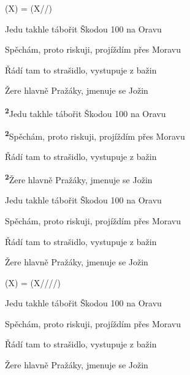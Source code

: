 \begin{song}


\bigskip

(X) = (X//)
\medskip
{}
\medskip

Jedu takhle tábořit Škodou 100 na Oravu \par
{}Spěchám, proto riskuji, projíždím přes Moravu \par
{}Řádí tam to strašidlo, vystupuje z bažin \par
{}Žere hlavně Pražáky, jmenuje se Jožin \par

\bigskip

\textsuperscript{\textbf2}Jedu takhle tábořit Škodou 100 na Oravu \par
{}\textsuperscript{\textbf2}Spěchám, proto riskuji, projíždím přes Moravu \par
{}Řádí tam to strašidlo, vystupuje z bažin \par
{}\textsuperscript{\textbf2}Žere hlavně Pražáky, jmenuje se Jožin \par

\bigskip

Jedu takhle tábořit Škodou 100 na Oravu \par
{}Spěchám, proto riskuji, projíždím přes Moravu \par
{}Řádí tam to strašidlo, vystupuje
z bažin \par
{}Žere hlavně Pražáky, jmenuje se
Jožin \par

\bigskip

(X) = (X////)
\medskip

Jedu takhle tábořit Škodou 100 na Oravu \par
{}Spěchám, proto riskuji, projíždím přes Moravu \par
{}Řádí tam to strašidlo, vystupuje z bažin \par
{}Žere hlavně Pražáky, jmenuje se Jožin \par


\end{song}
